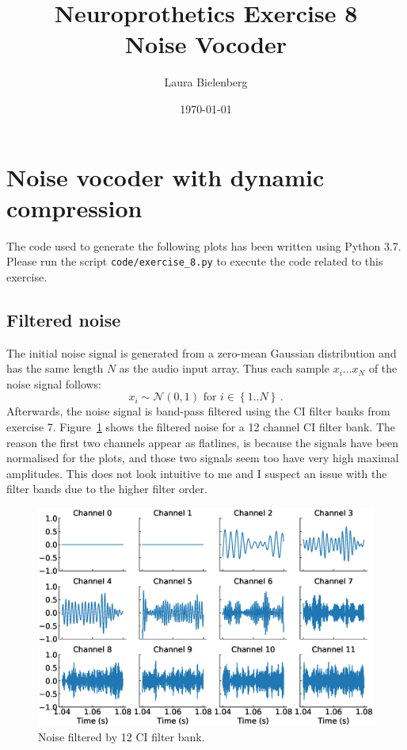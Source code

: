 \documentclass{scrartcl}			%
\title{Neuroprothetics Exercise 8\\Noise Vocoder}
\author{ Laura Bielenberg }
\date{\today}
\begin{document}

\maketitle


\section{Noise vocoder with dynamic compression}
The code used to generate the following plots has been written using Python 3.7. Please run the  script \texttt{code/exercise\_8.py} to execute the code related to this exercise.

\subsection{Filtered noise}\label{sec:filtnoise}
The initial noise signal is generated from a zero-mean Gaussian distribution and has the same length $N$ as the audio input array. Thus each sample $x_i ... x_N$ of the noise signal follows:
\begin{equation}
	x_i \sim \mathcal{N}(0, 1) \text{ for } i \in \left\{1 .. N\right\} \, .
\end{equation}
Afterwards, the noise signal is band-pass filtered using the CI filter banks from exercise 7.
Figure~\ref{fig:noise} shows the filtered noise for a 12 channel CI filter bank. The reason the first two channels appear as flatlines, is because the signals have been normalised for the plots, and those two signals seem too have very high maximal amplitudes. This does not look intuitive to me and I suspect an issue with the filter bands due to the higher filter order.

\begin{figure}[H]
\centering
   		 \includegraphics[width=\linewidth]{imgs/noise_filtered_timeslot.eps}
   		 \caption{Noise filtered by 12 CI filter bank.} 
   		 \label{fig:noise} 
\end{figure}
\end{document}
